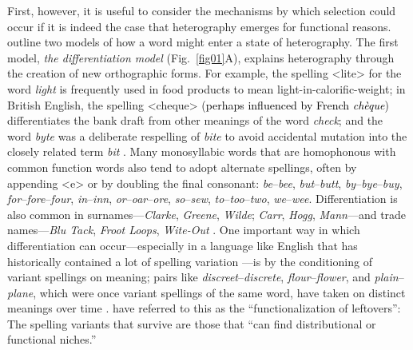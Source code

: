 \documentclass[doc,biblatex]{apa7}
\newcommand\newmaterial[1]{\textcolor{black}{#1}}
\begin{document}
First, however, it is useful to consider the mechanisms by which selection could occur if it is indeed the case that heterography emerges for functional reasons. \textcite[pp.~325--326]{Berg:2021} outline two models of how a word might enter a state of heterography. The first model, \textit{the differentiation model} (Fig.~\ref{fig01}A), explains heterography through the creation of new orthographic forms. For example, the spelling <lite> for the word \textit{light} is frequently used in food products to mean light-in-calorific-weight; in British English, the spelling <cheque> (\newmaterial{perhaps influenced by French \textit{chèque}}) differentiates the bank draft from other meanings of the word \textit{check}; and the word \textit{byte} was a deliberate respelling of \textit{bite} to avoid accidental mutation into the closely related term \textit{bit} \parencite{Buchholz:1977}. Many monosyllabic words that are homophonous with common function words also tend to adopt alternate spellings, often by appending <e> or by doubling the final consonant: \textit{be}--\textit{bee}, \textit{but}--\textit{butt}, \textit{by}--\textit{bye}--\textit{buy}, \textit{for}--\textit{fore}--\textit{four}, \textit{in}--\textit{inn}, \textit{or}--\textit{oar}--\textit{ore}, \textit{so}--\textit{sew}, \textit{to}--\textit{too}--\textit{two}, \textit{we}--\textit{wee}. Differentiation is also common in surnames---\textit{Clarke}, \textit{Greene}, \textit{Wilde}; \textit{Carr}, \textit{Hogg}, \textit{Mann}---and trade names---\textit{Blu Tack}, \textit{Froot Loops}, \textit{Wite-Out} \parencite[§~6]{Carney:1994}. One important way in which differentiation can occur---especially in a language like English that has historically contained a lot of spelling variation \parencite{Nevalainen:2012, Stenroos:2016}---is by the conditioning of variant spellings on meaning; pairs like \textit{discreet}--\textit{discrete}, \textit{flour}--\textit{flower}, and \textit{plain}--\textit{plane}, which were once variant spellings of the same word, have taken on distinct meanings over time \parencite[§~5.4]{Carney:1994}. \textcite[p.~58]{Berg:2017} have referred to this as the ``functionalization of leftovers'': The spelling variants that survive are those that ``can find distributional or functional niches.''
\end{document}
